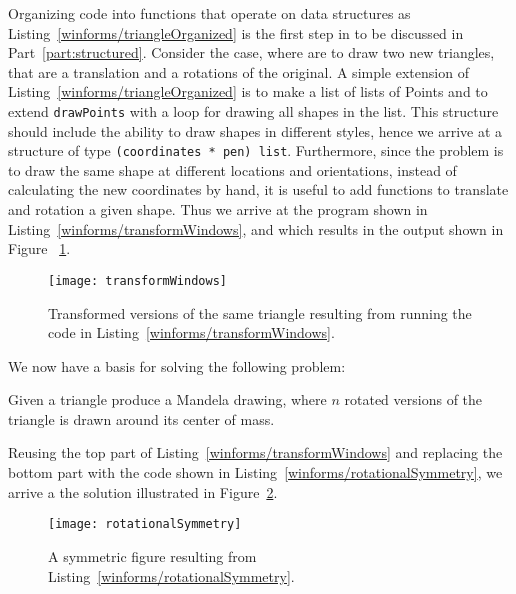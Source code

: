 Organizing code into functions that operate on data structures as Listing~\ref{winforms/triangleOrganized} is the first step in  to be discussed in Part~\ref{part:structured}. Consider the case, where are to draw two new triangles, that are a translation and a rotations of the original. A simple extension of Listing~\ref{winforms/triangleOrganized} is to make a list of lists of Points and to extend \lstinline!drawPoints! with a loop for drawing all shapes in the list. This structure should include the ability to draw shapes in different styles, hence we arrive at a structure of type \lstinline!(coordinates * pen) list!. Furthermore, since the problem is to draw the same shape at different locations and orientations, instead of calculating the new coordinates by hand, it is useful to add functions to translate and rotation a given shape. Thus we arrive at the program shown in Listing~\ref{winforms/transformWindows}, and which results in the output shown in
Figure~ \ref{fig:transformWindow}.
%
%
\begin{figure}
  \centering
  \texttt{[image: transformWindows]}
  \caption{Transformed versions of the same triangle resulting from running the code in Listing~\ref{winforms/transformWindows}.}
  \label{fig:transformWindow}
\end{figure}
We now have a basis for solving the following problem:
\begin{problem}
  Given a triangle produce a Mandela drawing, where $n$ rotated versions of the triangle is drawn around its center of mass.
\end{problem}
Reusing the top part of Listing~\ref{winforms/transformWindows} and replacing the bottom part with the code shown in Listing~\ref{winforms/rotationalSymmetry}, we arrive a the solution illustrated in Figure~\ref{fig:rotationalSymmetry}.
%
%
\begin{figure}
  \centering
  \texttt{[image: rotationalSymmetry]}
  \caption{A symmetric figure resulting from Listing~\ref{winforms/rotationalSymmetry}.}
  \label{fig:rotationalSymmetry}
\end{figure}

